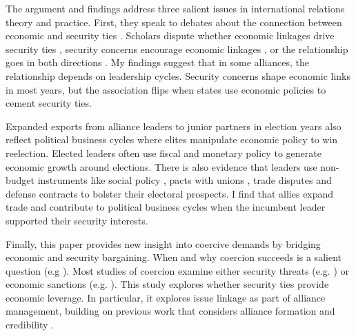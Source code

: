 \documentclass[12pt]{article}
\begin{document}
The argument and findings address three salient issues in international relations theory and practice. 
First, they speak to debates about the connection between economic and security ties \citep{Mastanduno2009, Poast2019}. 
Scholars dispute whether economic linkages drive security ties \citep{BiglaiserDeRouen2007, Fordham2010, Kimball2010}, security concerns encourage economic linkages \citep{Gowa1995, Li2003, LongLeeds2006, GowaMansfield2004}, or the relationship goes in both directions \citep{BiglaiserDeRouen2009, KinneBunte2018}. 
My findings suggest that in some alliances, the relationship depends on leadership cycles. 
Security concerns shape economic links in most years, but the association flips when states use economic policies to cement security ties.


Expanded exports from alliance leaders to junior partners in election years also reflect political business cycles where elites manipulate economic policy to win reelection. 
Elected leaders often use fiscal \citep{Rogoff1987} and monetary policy \citep{ClarkHallerberg2000} to generate economic growth around elections. 
There is also evidence that leaders use non-budget instruments like social policy \citep{Philips2020}, pacts with unions \citep{Ahlquist2010}, trade disputes \citep{Conconietal2017} and defense contracts \citep{DerouenHeo2000} to bolster their electoral prospects. 
I find that allies expand trade and contribute to political business cycles when the incumbent leader supported their security interests.


Finally, this paper provides new insight into coercive demands by bridging economic and security bargaining.
When and why coercion succeeds is a salient question (e.g \citep{Sechser2010, Sechser2018, Cebuletal2021}).  
Most studies of coercion examine either security threats (e.g. \citep{HorowitzReiter2001, Sechser2011}) or economic sanctions (e.g. \citep{Marinov2005, Allen2008, Escriba-FolchWright2010}).
This study explores whether security ties provide economic leverage. 
In particular, it explores issue linkage as part of alliance management, building on previous work that considers alliance formation \citep{Poast2012} and credibility \citep{Davis2008, Poast2013}. 


\end{document}
